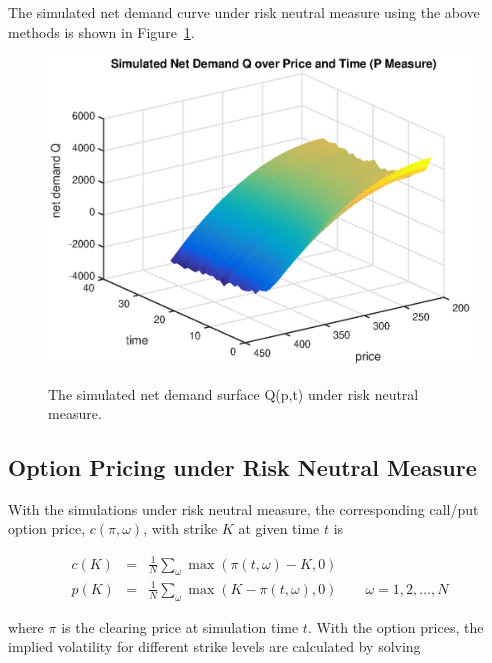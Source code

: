 \documentclass{article}
\begin{document}
The simulated net demand curve under risk neutral measure using the above methods is shown in Figure~\ref{fig::AAPL_20110401_simulated_Q_P_measure}.

\begin{center}
\begin{figure}
  \centering
  \includegraphics[scale = 0.5]{Simulated_Q_P_Measure.eps}\\
  \caption{The simulated net demand surface Q(p,t) under risk neutral measure.}\label{fig::AAPL_20110401_simulated_Q_P_measure}
\end{figure}
\end{center}

\newpage
\subsection{Option Pricing under Risk Neutral Measure}
With the simulations under risk neutral measure, the corresponding call/put option price, $c(\pi, \omega)$, with strike $K$ at given time $t$ is

\begin{eqnarray*}
c(K) &=& \frac{1}{N} \sum_{\omega} \max\left(\pi(t,\omega)-K,0\right) \\
p(K) &=& \frac{1}{N} \sum_{\omega} \max\left(K - \pi(t,\omega),0\right) \qquad \omega = 1,2,\ldots,N
\end{eqnarray*}

where $\pi$ is the clearing price at simulation time $t$. With the option prices, the implied volatility for different strike levels are calculated by solving
\end{document}
